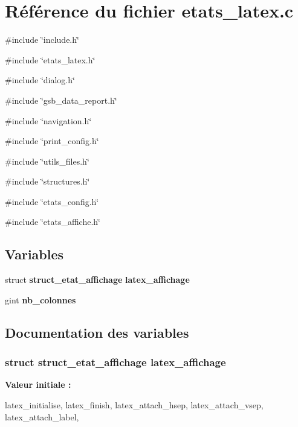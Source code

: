\section{Référence du fichier etats\_\-latex.c}
\label{etats__latex_8c}
{\ttfamily \#include \char`\"{}include.h\char`\"{}}\par
{\ttfamily \#include \char`\"{}etats\_\-latex.h\char`\"{}}\par
{\ttfamily \#include \char`\"{}dialog.h\char`\"{}}\par
{\ttfamily \#include \char`\"{}gsb\_\-data\_\-report.h\char`\"{}}\par
{\ttfamily \#include \char`\"{}navigation.h\char`\"{}}\par
{\ttfamily \#include \char`\"{}print\_\-config.h\char`\"{}}\par
{\ttfamily \#include \char`\"{}utils\_\-files.h\char`\"{}}\par
{\ttfamily \#include \char`\"{}structures.h\char`\"{}}\par
{\ttfamily \#include \char`\"{}etats\_\-config.h\char`\"{}}\par
{\ttfamily \#include \char`\"{}etats\_\-affiche.h\char`\"{}}\par
\subsection*{Variables}
\begin{DoxyCompactItemize}
\item 
struct {\bf struct\_\-etat\_\-affichage} {\bf latex\_\-affichage}
\item 
gint {\bf nb\_\-colonnes}
\end{DoxyCompactItemize}


\subsection{Documentation des variables}
\subsubsection[{latex\_\-affichage}]{\setlength{\rightskip}{0pt plus 5cm}struct {\bf struct\_\-etat\_\-affichage} {\bf latex\_\-affichage}}\label{etats__latex_8c_aa79551ad1b2719219e91f89607c560d8}
{\bfseries Valeur initiale :}
\begin{DoxyCode}
 {
    latex_initialise,
    latex_finish,
    latex_attach_hsep,
    latex_attach_vsep,
    latex_attach_label,
}
\end{DoxyCode}


